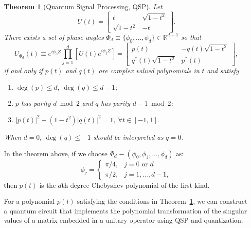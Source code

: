 \documentclass{article}
\newtheorem{theorem}{Theorem}[section]
\begin{document}
    \begin{theorem}[Quantum Signal Processing, QSP]
        \label{thm:qsp}
        Let
        \begin{equation}
            U(t) =
            \begin{bmatrix}
                t              & \sqrt{1 - t^2} \\
                \sqrt{1 - t^2} & -t
            \end{bmatrix}.\label{eq:equation15}
        \end{equation}
        There exists a set of phase angles $\Phi_d \equiv \{\phi_0, \ldots, \phi_d\} \in \mathbb{R}^{d+1}$ so that
        \begin{equation}
            U_{\Phi_d}(t) \equiv e^{i\phi_0 Z} \prod_{j=1}^d \left[ U(t) e^{i\phi_j Z} \right] =
            \begin{bmatrix}
                p(t)                 & -q(t)\sqrt{1 - t^2} \\
                q^*(t)\sqrt{1 - t^2} & p^*(t)
            \end{bmatrix},\label{eq:equation16}
        \end{equation}
        if and only if $p(t)$ and $q(t)$ are complex valued polynomials in $t$ and satisfy
        \begin{enumerate}
            \item $\deg(p) \leq d$, $\deg(q) \leq d - 1$;
            \item $p$ has parity $d \bmod 2$ and $q$ has parity $d - 1 \bmod 2$;
            \item $|p(t)|^2 + (1 - t^2)|q(t)|^2 = 1$, $\forall t \in [-1, 1]$.
        \end{enumerate}
        When $d = 0$, $\deg(q) \leq -1$ should be interpreted as $q = 0$.

    \end{theorem}

    In the theorem above, if we choose $\Phi_d \equiv (\phi_0, \phi_1, \ldots, \phi_d)$ as:
    \begin{equation}
        \phi_j =
        \begin{cases}
            \pi/4, & j = 0 \text{ or } d \\
            \pi/2, & j = 1, \ldots, d-1,
        \end{cases}
    \end{equation}
    then $p(t)$ is the $d$th degree Chebyshev polynomial of the first kind.

    For a polynomial $p(t)$ satisfying the conditions in Theorem~\ref{thm:qsp}, we can construct a quantum circuit that implements the polynomial transformation of the singular values of a matrix embedded in a unitary operator using QSP and quantization.
\end{document}
